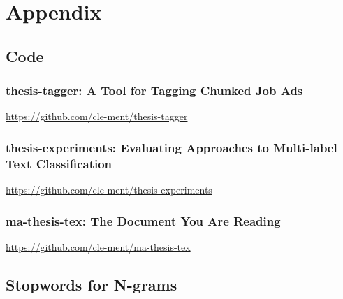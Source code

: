 
\renewcommand{\theequation}{B\arabic{equation}}
\setcounter{equation}{0}
\renewcommand{\thefigure}{B\arabic{figure}}
\setcounter{figure}{0}
\renewcommand{\thetable}{B\arabic{table}}
\setcounter{table}{0}


\clearpage

\thesisappendix

\section{Appendix}

\subsection{Code}

\subsubsection*{thesis-tagger: A Tool for Tagging Chunked Job Ads}
\label{sub:thesis-tagger: A Tool for Tagging Chunked Job Ads}

\url{https://github.com/cle-ment/thesis-tagger}

\subsubsection*{thesis-experiments: Evaluating Approaches to Multi-label Text Classification}
\label{sub:thesis-experiments: Evaluating Approaches to Multi-label Text Classification}


\url{https://github.com/cle-ment/thesis-experiments}

\subsubsection*{ma-thesis-tex: The Document You Are Reading}
\label{sub:ma-thesis-tex: The Document You Are Reading}

\url{https://github.com/cle-ment/ma-thesis-tex}

\clearpage
\subsection{Stopwords for N-grams}
\label{sub:Stopwords for N-grams}


